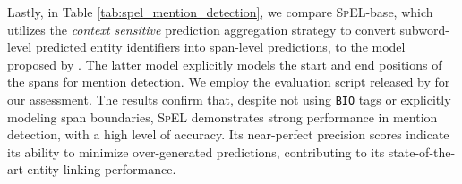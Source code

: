 \documentclass[11pt]{article}
\begin{document}
Lastly, in Table \ref{tab:spel_mention_detection}, we compare \textsc{SpEL}-base, which utilizes the \textit{context sensitive} prediction aggregation strategy to convert subword-level predicted entity identifiers into span-level predictions, to the model proposed by \citet{2021.emnlp-main.604}. The latter model explicitly models the start and end positions of the spans for mention detection. We employ the evaluation script released by \citet{2021.emnlp-main.604} for our assessment. The results confirm that, despite not using \texttt{BIO} tags or explicitly modeling span boundaries, \textsc{SpEL} demonstrates strong performance in mention detection, with a high level of accuracy. Its near-perfect precision scores indicate its ability to minimize over-generated predictions, contributing to its state-of-the-art entity linking performance.
\end{document}
